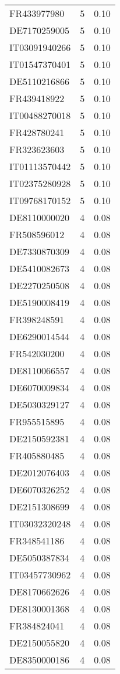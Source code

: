 \begin{table*}[htbp]
\begin{tabular}{lrr}
FR433977980 & 5 & 0.10 \\
DE7170259005 & 5 & 0.10 \\
IT03091940266 & 5 & 0.10 \\
IT01547370401 & 5 & 0.10 \\
DE5110216866 & 5 & 0.10 \\
FR439418922 & 5 & 0.10 \\
IT00488270018 & 5 & 0.10 \\
FR428780241 & 5 & 0.10 \\
FR323623603 & 5 & 0.10 \\
IT01113570442 & 5 & 0.10 \\
IT02375280928 & 5 & 0.10 \\
IT09768170152 & 5 & 0.10 \\
DE8110000020 & 4 & 0.08 \\
FR508596012 & 4 & 0.08 \\
DE7330870309 & 4 & 0.08 \\
DE5410082673 & 4 & 0.08 \\
DE2270250508 & 4 & 0.08 \\
DE5190008419 & 4 & 0.08 \\
FR398248591 & 4 & 0.08 \\
DE6290014544 & 4 & 0.08 \\
FR542030200 & 4 & 0.08 \\
DE8110066557 & 4 & 0.08 \\
DE6070009834 & 4 & 0.08 \\
DE5030329127 & 4 & 0.08 \\
FR955515895 & 4 & 0.08 \\
DE2150592381 & 4 & 0.08 \\
FR405880485 & 4 & 0.08 \\
DE2012076403 & 4 & 0.08 \\
DE6070326252 & 4 & 0.08 \\
DE2151308699 & 4 & 0.08 \\
IT03032320248 & 4 & 0.08 \\
FR348541186 & 4 & 0.08 \\
DE5050387834 & 4 & 0.08 \\
IT03457730962 & 4 & 0.08 \\
DE8170662626 & 4 & 0.08 \\
DE8130001368 & 4 & 0.08 \\
FR384824041 & 4 & 0.08 \\
DE2150055820 & 4 & 0.08 \\
DE8350000186 & 4 & 0.08 \\

\end{tabular}
\end{table*}
